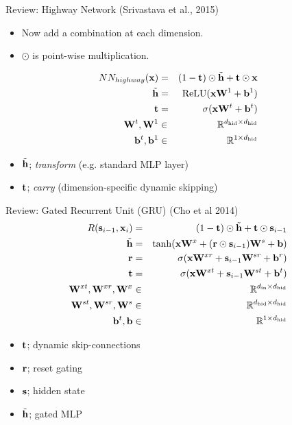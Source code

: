 \documentclass{beamer}
\begin{document}
\begin{frame}{Review: Highway Network (Srivastava et al., 2015)}
  \begin{itemize}
  \item Now add a combination at each dimension.
  \item $\odot$ is point-wise multiplication. 
  \end{itemize}
  \begin{eqnarray*}
    NN_{highway}(\boldx) &=& (1-\boldt) \odot \tilde{\boldh} + \boldt \odot \boldx \\
    \tilde{\boldh} &=& \relu(\boldx \boldW^1 + \boldb^1) \\
    \boldt &=& \sigma(\boldx \boldW^t + \boldb^t) \\
    \boldW^t, \boldW^1 &\in& \reals^{\dhid \times \dhid} \\
    \boldb^t, \boldb^1 &\in& \reals^{1 \times \dhid} 
  \end{eqnarray*}
  \begin{itemize}
  \item $\tilde{\mathbf{h}}$; \textit{transform} (e.g. standard MLP layer)
  \item $\mathbf{t}$; \textit{carry} (dimension-specific dynamic skipping)
  \end{itemize}
\end{frame}


\begin{frame}{Review: Gated Recurrent Unit (GRU) (Cho et al 2014)}
    \begin{eqnarray*}
      R(\mathbf{s}_{i-1}, \mathbf{x}_i) &=& (1-\mathbf{t}) \odot \tilde{\mathbf{h}} + \mathbf{t} \odot \mathbf{s}_{i-1} \\
      \tilde{\mathbf{h}} &=& \tanh(\mathbf{x} \mathbf{W}^x + (\mathbf{r} \odot \mathbf{s}_{i-1})  \mathbf{W}^s + \mathbf{b})  \\
      \mathbf{r} &=& \sigma(\mathbf{x} \mathbf{W}^{xr} + \mathbf{s}_{i-1}\mathbf{W}^{sr} + \mathbf{b}^r) \\
      \mathbf{t} &=& \sigma(\mathbf{x} \mathbf{W}^{xt} + \mathbf{s}_{i-1}\mathbf{W}^{st} + \mathbf{b}^t) \\
      \mathbf{W}^{xt}, \mathbf{W}^{xr}, \mathbf{W}^{x} &\in& \mathbb{R}^{{d_{\mathrm{in}}} \times {d_{\mathrm{hid}}}} \\
      \mathbf{W}^{st}, \mathbf{W}^{sr}, \mathbf{W}^{s} &\in& \mathbb{R}^{{d_{\mathrm{hid}}} \times {d_{\mathrm{hid}}}} \\
      \mathbf{b}^t, \mathbf{b} &\in& \mathbb{R}^{1 \times {d_{\mathrm{hid}}}} \\
    \end{eqnarray*}

    \begin{itemize}
    \item $\mathbf{t}$; dynamic skip-connections
    \item $\mathbf{r}$; reset gating
    \item $\mathbf{s}$; hidden state
    \item $\tilde{\mathbf{h}}$; gated MLP
    \end{itemize}
\end{frame}
\end{document}
